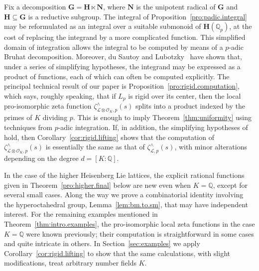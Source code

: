 \documentclass[11pt,a4paper]{amsart}
\theoremstyle{plain}
\theoremstyle{remark}
\newcommand{\Q}{\mathbb{Q}}
\newcommand{\tensor}{\otimes}
\begin{document}
Fix a decomposition $\mathbf{G} = \mathbf{H} \ltimes \mathbf{N}$, where $\mathbf{N}$ is the unipotent radical of $\mathbf{G}$ and $\mathbf{H} \subseteq \mathbf{G}$ is a reductive subgroup.  The integral of Proposition~\ref{pro:padic.integral} may be reformulated as an integral over a suitable submonoid of $\mathbf{H} (\Q_p)$, at the cost of replacing the integrand by a more complicated function.  This simplified domain of integration allows the integral to be computed by means of a $p$-adic Bruhat decomposition.  
Moreover, du Sautoy and Lubotzky~\cite{duSLubotzky/96} have shown that, under a series of simplifying hypotheses, the integrand may be expressed as a product of functions, each of which can often be computed explicitly. 
The principal technical result of our paper is Proposition~\ref{pro:rigid.computation}, which says, roughly speaking, that if $L_p$ is rigid over its center, then the local pro-isomorphic zeta function $\zeta^\wedge_{\mathcal{L} \tensor \mathcal{O}_K, p}(s)$ splits into a product indexed by the primes of $K$ dividing $p$.  This is enough to imply Theorem~\ref{thm:uniformity} using techniques from $p$-adic integration.  
If, in addition, the simplifying hypotheses of~\cite{duSLubotzky/96} hold, then Corollary~\ref{cor:rigid.lifting} shows that the computation of $\zeta^\wedge_{\mathcal{L} \tensor \mathcal{O}_K, p}(s)$ is essentially the same as that of $\zeta^\wedge_{\mathcal{L},p}(s)$, with minor alterations depending on the degree $d = [K:\Q]$. 


In the case of the higher Heisenberg Lie lattices, the explicit rational functions given in Theorem~\ref{pro:higher.final} below are new even when $K = \Q$, except for several small cases.  Along the way we prove a combinatorial identity involving the hyperoctahedral group, Lemma~\ref{lem:bm.to.sm}, that may have independent interest.  For the remaining examples mentioned in Theorem~\ref{thm:intro.examples}, the pro-isomorphic local zeta functions in the case $K = \Q$ were known previously; their computation is straightforward in some cases and quite intricate in others.  In Section~\ref{sec:examples} we apply Corollary~\ref{cor:rigid.lifting} to show that the same calculations, with slight modifications, treat arbitrary number fields $K$.
\end{document}
